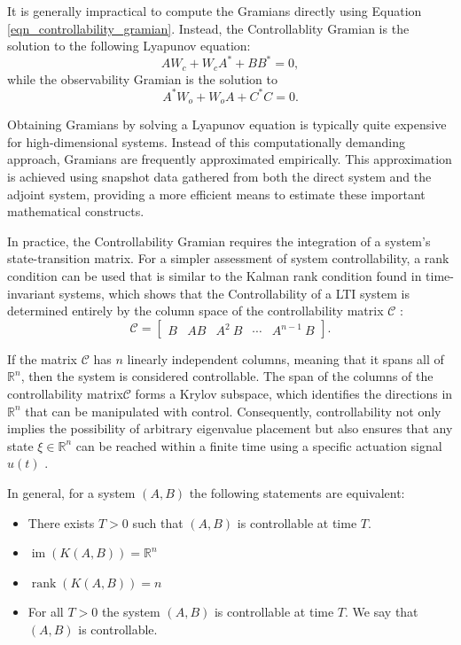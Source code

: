 It is generally impractical to compute the Gramians directly using Equation \ref{eqn_controllability_gramian}. Instead, the Controllablity Gramian is the solution to the following Lyapunov equation:
\begin{equation}
{A W}_c+{W}_c {A}^*+{B B}^*={0},
\end{equation}
while the observability Gramian is the solution to
\begin{equation}
{A}^* {W}_o+{W}_o {A}+{C}^* {C}={0} .
\end{equation}

Obtaining Gramians by solving a Lyapunov equation is typically quite expensive for high-dimensional systems. Instead of this computationally demanding approach, Gramians are frequently approximated empirically. This approximation is achieved using snapshot data gathered from both the direct system and the adjoint system, providing a more efficient means to estimate these important mathematical constructs.

In practice, the Controllability Gramian requires the integration of a system's state-transition matrix. For a simpler assessment of system controllability, a rank condition can be used that is similar to the Kalman rank condition found in time-invariant systems, which shows that the Controllability of a LTI system is determined entirely by the column space of the controllability matrix $\mathcal{C}$ :
\begin{equation}
\mathcal{C}=\left[\begin{array}{lllll}
{B} & {AB} & {A}^2 {~B} & \cdots & {A}^{n-1} {~B}
\end{array}\right] .
\end{equation}

If the matrix $\mathcal{C}$ has $n$ linearly independent columns, meaning that it spans all of $\mathbb{R}^n$, then the system is considered controllable. The span of the columns of the controllability matrix$\mathcal{C}$ forms a Krylov subspace, which identifies the directions in $\mathbb{R}^n$ that can be manipulated with control. Consequently, controllability not only implies the possibility of arbitrary eigenvalue placement but also ensures that any state $\xi \in \mathbb{R}^n$  can be reached within a finite time using a specific actuation signal ${u}(t)$ \parencite{brunton2022data}.

In general, for a system $(A, B)$ the following statements are equivalent:
\begin{itemize}
    \item There exists $T>0$ such that $(A, B)$ is controllable at time $T$.
    \item $\operatorname{im}(K(A, B))=\mathbb{R}^n$
    \item $\operatorname{rank}(K(A, B))=n$
    \item For all $T>0$ the system $(A, B)$ is controllable at time $T$. We say that $(A, B)$ is controllable.
\end{itemize}

